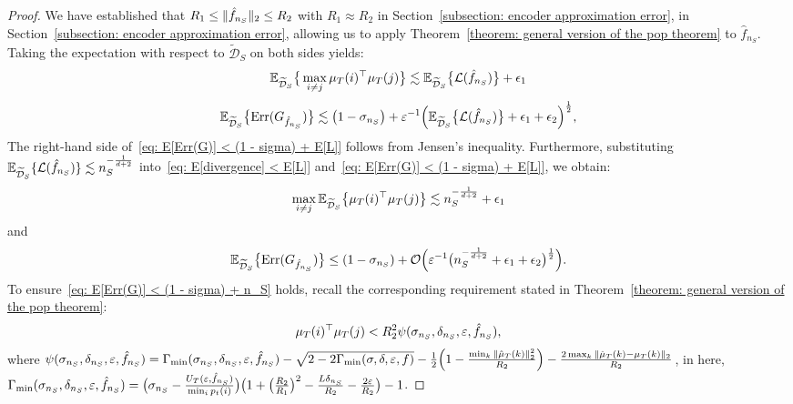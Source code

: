 \begin{proof}
    We have established that $R_1 \leq \Vert{\hat{f}_{n_S}}\Vert_2 \leq R_2$ with $R_1 \approx R_2$ in Section~\ref{subsection: encoder approximation error}, in Section~\ref{subsection: encoder approximation error}, allowing us to apply Theorem~\ref{theorem: general version of the pop theorem} to $\hat{f}_{n_S}$. Taking the expectation with respect to $\widetilde{\mathcal{D}}_S$ on both sides yields:
    \begin{align}\label{eq: E[divergence] < E[L]}
    \mathbb{E}_{\widetilde{\mathcal{D}}_S}\big\{\max_{i \neq j}\mu_T(i)^{\top}\mu_T(j)\big\} \lesssim \mathbb{E}_{\widetilde{\mathcal{D}}_S}\big\{\mathcal{L}(\hat{f}_{n_S})\big\} + \epsilon_1
    \end{align}
    \begin{align}\label{eq: E[Err(G)] < (1 - sigma) + E[L]}
    \mathbb{E}_{\widetilde{\mathcal{D}}_S}\big\{\mathrm{Err}(G_{\hat{f}_{n_S}})\big\} \lesssim \big(1 - \sigma_{n_S}\big) + \varepsilon^{-1}\Big(\mathbb{E}_{\widetilde{\mathcal{D}}_S}\big\{\mathcal{L}(\hat{f}_{n_S})\big\} + \epsilon_1 + \epsilon_2\Big)^{\frac{1}{2}},
    \end{align}
    The right-hand side of~\eqref{eq: E[Err(G)] < (1 - sigma) + E[L]} follows from Jensen's inequality. Furthermore, substituting $\mathbb{E}_{\widetilde{\mathcal{D}}_S}\{\mathcal{L}(\hat{f}_{n_S})\}\lesssim n_S^{-\frac{1}{d+2}}$ into~\eqref{eq: E[divergence] < E[L]} and~\eqref{eq: E[Err(G)] < (1 - sigma) + E[L]}, we obtain:
    \begin{align}\label{eq: E[divergence] < n_S}
    \max_{i \neq j}\mathbb{E}_{\widetilde{\mathcal{D}}_S}\big\{\mu_T(i)^{\top}\mu_T(j)\big\} \lesssim n_S^{-\frac{1}{d+2}} + \epsilon_1
    \end{align}
    and
    \begin{align}\label{eq: E[Err(G)] < (1 - sigma) + n_S}
    \mathbb{E}_{\widetilde{\mathcal{D}}_S}\big\{\mathrm{Err}(G_{\hat{f}_{n_S}})\big\}\leq (1 - \sigma_{n_S}) + \mathcal{O}\Big(\varepsilon^{-1}\big(n_S^{-\frac{1}{d+2}} + \epsilon_1 + \epsilon_2\big)^{\frac{1}{2}}\Big).
    \end{align}
    To ensure~\eqref{eq: E[Err(G)] < (1 - sigma) + n_S} holds, recall the corresponding requirement stated in Theorem~\ref{theorem: general version of the pop theorem}:
    \begin{align*}
        \mu_T(i)^{\top}\mu_T(j) < R_2^2\psi(\sigma_{n_S}, \delta_{n_S}, \varepsilon, \hat{f}_{n_S}),
    \end{align*}
    where $\psi(\sigma_{n_S}, \delta_{n_S}, \varepsilon,\hat{f}_{n_S}) = \Gamma_{\min}(\sigma_{n_S}, \delta_{n_S}, \varepsilon, \hat{f}_{n_S}) - \sqrt{2 - 2\Gamma_{\min}(\sigma, \delta, \varepsilon, f)} - \frac{1}{2}\Big(1 - \frac{\min_k\Vert{\hat{\mu}_T(k)}\Vert_2^2}{R_2}\Big)
  - \frac{2\max_k\Vert{\hat{\mu}_T(k) - \mu_T(k)}\Vert_2}{R_2}$, in here, $\Gamma_{\min}(\sigma_{n_S}, \delta_{n_S}, \varepsilon, \hat{f}_{n_S}) = 
    \big(\sigma_{n_S} - \frac{U_T(\varepsilon, \hat{f}_{n_S})}{\min_ip_t(i)}\big)\big(1 + \big(\frac{R_2}{R_1}\big)^2 - \frac{L\delta_{n_S}}{R_2} - \frac{2\varepsilon}{R_2}\big) - 1$.
    

\end{proof}
